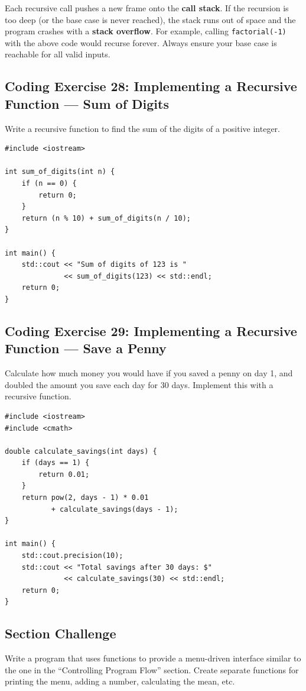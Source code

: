 \begin{remark}
	Each recursive call pushes a new frame onto the \textbf{call stack}. If the recursion is too deep (or the base case is never reached), the stack runs out of space and the program crashes with a \textbf{stack overflow}. For example, calling \texttt{factorial(-1)} with the above code would recurse forever. Always ensure your base case is reachable for all valid inputs.
\end{remark}

\subsection{Coding Exercise 28: Implementing a Recursive Function --- Sum of Digits}
Write a recursive function to find the sum of the digits of a positive integer.
\begin{lstlisting}
#include <iostream>

int sum_of_digits(int n) {
	if (n == 0) {
		return 0;
	}
	return (n % 10) + sum_of_digits(n / 10);
}

int main() {
	std::cout << "Sum of digits of 123 is "
	          << sum_of_digits(123) << std::endl;
	return 0;
}
\end{lstlisting}

\subsection{Coding Exercise 29: Implementing a Recursive Function --- Save a Penny}
Calculate how much money you would have if you saved a penny on day 1, and doubled the amount you save each day for 30 days. Implement this with a recursive function.
\begin{lstlisting}
#include <iostream>
#include <cmath>

double calculate_savings(int days) {
	if (days == 1) {
		return 0.01;
	}
	return pow(2, days - 1) * 0.01
	       + calculate_savings(days - 1);
}

int main() {
	std::cout.precision(10);
	std::cout << "Total savings after 30 days: $"
	          << calculate_savings(30) << std::endl;
	return 0;
}
\end{lstlisting}

\subsection{Section Challenge}
Write a program that uses functions to provide a menu-driven interface similar to the one in the ``Controlling Program Flow'' section. Create separate functions for printing the menu, adding a number, calculating the mean, etc.

